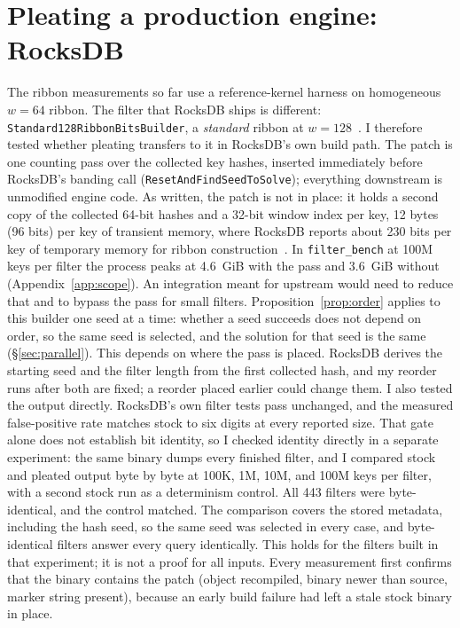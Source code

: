 \documentclass[a4paper,UKenglish,cleveref,autoref,thm-restate,anonymous]{lipics-v2021}
\begin{document}
\section{Pleating a production engine: RocksDB}\label{sec:rocksdb}
The ribbon measurements so far use a reference-kernel harness on homogeneous $w=64$ ribbon. The filter that
RocksDB ships is different: \texttt{Standard128RibbonBitsBuilder}, a
\emph{standard} ribbon at $w=128$~\cite{rocksdbribbonblog}. I therefore tested whether
pleating transfers to it in RocksDB's own build path. The patch is one
counting pass over the collected key hashes, inserted immediately before RocksDB's banding call
(\texttt{ResetAndFindSeedToSolve}); everything downstream is unmodified engine code. As written, the patch is not in place: it holds a second copy of the collected 64-bit hashes and a 32-bit window index per key, 12 bytes (96 bits) per key of transient memory, where RocksDB reports about 230 bits per key of temporary memory for ribbon construction~\cite{rocksdbribbonblog}. In \texttt{filter\_bench} at 100M keys per filter the process peaks at 4.6~GiB with the pass and 3.6~GiB without (Appendix~\ref{app:scope}). An integration meant for upstream would need to reduce that and to bypass the pass for small filters. Proposition~\ref{prop:order}
applies to this builder one seed at a time: whether a seed succeeds does not depend on order, so
the same seed is selected, and the solution for that seed is the same (\S\ref{sec:parallel}). This
depends on where the pass is placed. RocksDB derives the starting seed and the filter length from the
first collected hash, and my reorder runs after both are fixed; a reorder placed earlier could
change them. I also tested the output directly. RocksDB's own filter tests pass unchanged, and the
measured false-positive rate matches stock to six digits at every reported size. That gate
alone does not establish bit identity, so I checked identity directly in a separate
experiment: the same binary dumps every finished filter, and I compared stock and pleated
output byte by byte at 100K, 1M, 10M, and 100M keys per filter, with a second stock run as a
determinism control. All 443 filters were byte-identical, and the control matched. The comparison covers the stored metadata, including the hash seed, so the same seed was selected in every case, and byte-identical filters answer every query identically. This holds for
the filters built in that experiment; it is not a proof for all inputs. Every measurement first confirms that the binary contains the patch (object recompiled, binary newer
than source, marker string present), because an early build failure had left a stale stock binary
in place.
\end{document}
